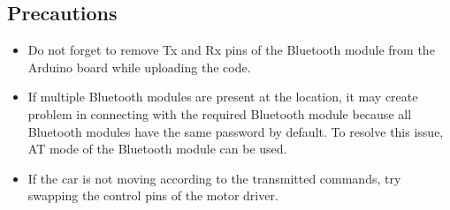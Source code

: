 \subsection*{Precautions}
\begin{itemize}[leftmargin=*] 
    \item Do not forget to remove Tx and Rx pins of the Bluetooth module from the Arduino board while uploading the code.
    \item If multiple Bluetooth modules are present at the location, it may create problem in connecting with the required Bluetooth module because all Bluetooth modules have the same password by default. To resolve this issue, AT mode of the Bluetooth module can be used.
    \item If the car is not moving according to the transmitted commands, try swapping the control pins of the motor driver.
\end{itemize}